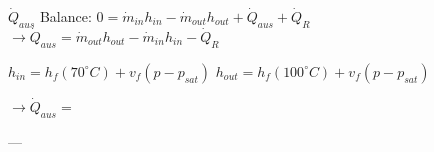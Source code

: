 \( \dot{Q}_{aus} \)  
Balance: \( 0 = \dot{m}_{in} h_{in} - \dot{m}_{out} h_{out} + \dot{Q}_{aus} + \dot{Q}_R \)  
\( \rightarrow \dot{Q}_{aus} = \dot{m}_{out} h_{out} - \dot{m}_{in} h_{in} - \dot{Q}_R \)  

\( h_{in} = h_f (70^\circ C) + v_f (p - p_{sat}) \)  
\( h_{out} = h_f (100^\circ C) + v_f (p - p_{sat}) \)  

\( \rightarrow \dot{Q}_{aus} = \)  

---